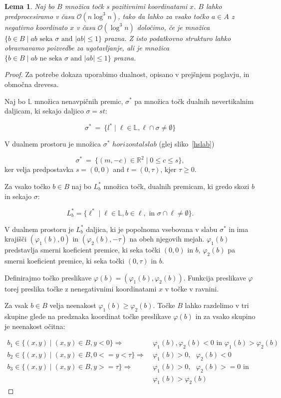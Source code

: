 \documentclass[a4paper, 12pt]{book}
\newcommand{\LL}{\ensuremath{\mathbb L}}
\newcommand{\RR}{\ensuremath{\mathbb R}}  %
\newcommand{\OO}{\ensuremath{\mathcal{O}}} %
\newtheorem{lema}[izrek]{Lema}
\begin{document}
\begin{lema}
\label{lema-ds2}
Naj bo $B$ množica točk s pozitivnimi koordinatami $x$. $B$ lahko predprocesiramo v času $\OO(n\log^3n)$, tako da lahko za vsako točko $a\in A$ z negativno koordinato $x$ v času $\OO(\log^3n)$ določimo, če je množica $\{ b\in B \mid \text{$ab$ seka $\sigma$ and $|ab|\le 1$}\}$ prazna. Z isto podatkovno strukturo lahko obravnavamo poizvedbe za ugotavljanje, ali je množica $\{ b\in B \mid \text{$ab$ ne seka $\sigma$ and $|ab|\le 1$}\}$ prazna.
\end{lema}

\begin{proof}
Za potrebe dokaza uporabimo dualnost, opisano v prejšnjem poglavju, in območna drevesa.

Naj bo $\LL$ množica nenavpičnih premic, $\sigma^*$ pa množica točk dualnih nevertikalnim daljicam, ki sekajo daljico $\sigma = st$:

\[
		\sigma^* ~=~ \{ l^* \mid \ell\in \LL, \ell\cap \sigma\neq \emptyset\} 
\]

V dualnem prostoru je množica $\sigma^*$ $horizontal slab$ (glej sliko~\ref{hslab})

\[
		\sigma^* ~=~ \{ (m,-c)\in \RR^2\mid 0\le c\le s\},
\]
ker velja predpostavka $s=(0,0)$ and $t=(0,\tau)$, kjer $\tau\ge 0$.


Za vsako točko $b\in B$ naj bo $L^* _b$ množica točk, dualnih premicam, ki gredo skozi $b$ in sekajo $\sigma$:

\[
		L^*_b=\{ \ell^* \mid \ell\in \LL, b \in \ell, \text{ in } \sigma\cap \ell\not= \emptyset\}.
	\]

V dualnem prostoru je $L^* _b$ daljica, ki je popolnoma vsebovana v slabu $\sigma^*$ in ima krajišči $(\varphi_1(b),0)$ in $(\varphi_2(b),-\tau)$ na obeh njegovih mejah. $\varphi_1(b)$ predstavlja smerni koeficient premice, ki seka točki $(0,0)$ in $b$, $\varphi_2(b)$ pa smerni koeficient premice, ki seka točki $(0,\tau)$ in $b$.

Definirajmo točko preslikave $\varphi(b)=(\varphi_1(b),\varphi_2(b))$. Funkcija preslikave $\varphi$ torej preslika točke z nenegativnimi koordinatami $x$ v točke v ravnini.

Za vsak $b\in B$ velja neenakost $\varphi_1(b) \geq \varphi_2(b)$. Točke $B$ lahko razdelimo v tri skupine glede na predznaka koordinat točke preslikave $\varphi(b)$ in za vsako skupino je neenakost očitna:

\begin{align*}
    b_1 \in \{ (x,y) \mid (x,y) \in B, y < 0 \} \Rightarrow &~ \varphi_1(b),\varphi_2(b) < 0 \text{ in } \varphi_1(b) > \varphi_2(b) \\
b_2 \in \{ (x,y) \mid (x,y) \in B, 0 <= y < \tau \} \Rightarrow &~ \varphi_1(b) > 0, \text{ } \varphi_2(b) < 0 \\
    b_3 \in \{ (x,y) \mid (x,y) \in B, y >= \tau \} \Rightarrow &~ \varphi_1(b) > 0, \text{ } \varphi_2(b) >= 0 \text{ in }\\ 
    &~\varphi_1(b) > \varphi_2(b)
\end{align*}


\end{proof}
\end{document}
